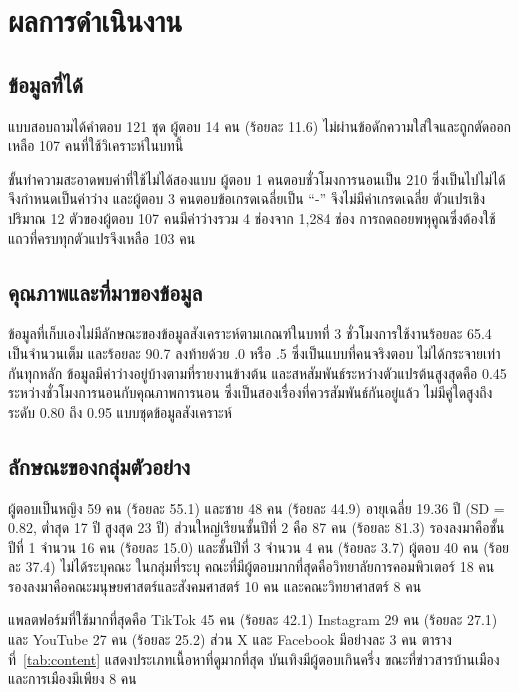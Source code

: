 \chapter{ผลการดำเนินงาน}

\section{ข้อมูลที่ได้}

แบบสอบถามได้คำตอบ 121 ชุด ผู้ตอบ 14 คน (ร้อยละ 11.6) ไม่ผ่านข้อดักความใส่ใจและถูกตัดออก
เหลือ 107 คนที่ใช้วิเคราะห์ในบทนี้

ขั้นทำความสะอาดพบค่าที่ใช้ไม่ได้สองแบบ
ผู้ตอบ 1 คนตอบชั่วโมงการนอนเป็น 210 ซึ่งเป็นไปไม่ได้ จึงกำหนดเป็นค่าว่าง
และผู้ตอบ 3 คนตอบข้อเกรดเฉลี่ยเป็น ``-'' จึงไม่มีค่าเกรดเฉลี่ย
ตัวแปรเชิงปริมาณ 12 ตัวของผู้ตอบ 107 คนมีค่าว่างรวม 4 ช่องจาก 1,284 ช่อง
การถดถอยพหุคูณซึ่งต้องใช้แถวที่ครบทุกตัวแปรจึงเหลือ 103 คน

\section{คุณภาพและที่มาของข้อมูล}

ข้อมูลที่เก็บเองไม่มีลักษณะของข้อมูลสังเคราะห์ตามเกณฑ์ในบทที่ 3
ชั่วโมงการใช้งานร้อยละ 65.4 เป็นจำนวนเต็ม และร้อยละ 90.7 ลงท้ายด้วย .0 หรือ .5
ซึ่งเป็นแบบที่คนจริงตอบ ไม่ได้กระจายเท่ากันทุกหลัก
ข้อมูลมีค่าว่างอยู่บ้างตามที่รายงานข้างต้น
และสหสัมพันธ์ระหว่างตัวแปรต้นสูงสุดคือ 0.45 ระหว่างชั่วโมงการนอนกับคุณภาพการนอน
ซึ่งเป็นสองเรื่องที่ควรสัมพันธ์กันอยู่แล้ว ไม่มีคู่ใดสูงถึงระดับ 0.80 ถึง 0.95 แบบชุดข้อมูลสังเคราะห์

\section{ลักษณะของกลุ่มตัวอย่าง}

ผู้ตอบเป็นหญิง 59 คน (ร้อยละ 55.1) และชาย 48 คน (ร้อยละ 44.9)
อายุเฉลี่ย 19.36 ปี (SD = 0.82, ต่ำสุด 17 ปี สูงสุด 23 ปี)
ส่วนใหญ่เรียนชั้นปีที่ 2 คือ 87 คน (ร้อยละ 81.3) รองลงมาคือชั้นปีที่ 1 จำนวน 16 คน (ร้อยละ 15.0)
และชั้นปีที่ 3 จำนวน 4 คน (ร้อยละ 3.7)
ผู้ตอบ 40 คน (ร้อยละ 37.4) ไม่ได้ระบุคณะ ในกลุ่มที่ระบุ
คณะที่มีผู้ตอบมากที่สุดคือวิทยาลัยการคอมพิวเตอร์ 18 คน
รองลงมาคือคณะมนุษยศาสตร์และสังคมศาสตร์ 10 คน และคณะวิทยาศาสตร์ 8 คน

แพลตฟอร์มที่ใช้มากที่สุดคือ TikTok 45 คน (ร้อยละ 42.1) Instagram 29 คน (ร้อยละ 27.1)
และ YouTube 27 คน (ร้อยละ 25.2) ส่วน X และ Facebook มีอย่างละ 3 คน
ตารางที่~\ref{tab:content} แสดงประเภทเนื้อหาที่ดูมากที่สุด
บันเทิงมีผู้ตอบเกินครึ่ง ขณะที่ข่าวสารบ้านเมืองและการเมืองมีเพียง 8 คน


